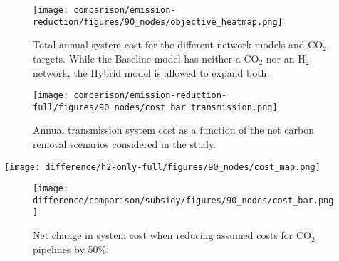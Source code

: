 \documentclass[twocolumn]{article}
\newcommand{\COtwo}{CO$_2$}
\newcommand{\Htwo}{H$_2$}
\newcommand{\Hgrid}{H$_2$\=/Grid}
\newcommand{\modBase}{Baseline model}
\newcommand{\modH}{H$_2$\=/Grid model}
\newcommand{\modHybrid}{Hybrid model}
\begin{document}
\printbibliography

\appendix




\begin{figure}
    \centering
    \texttt{[image: comparison/emission-reduction/figures/90\_nodes/objective\_heatmap.png]}
    \caption{Total annual system cost for the different network models and \COtwo{} targets. While the \modBase{} has neither a \COtwo{} nor an \Htwo{} network, the \modHybrid{} is allowed to expand both.}
    \label{fig:objective_heatmap}
\end{figure}


\begin{figure}[ht]
    \centering
    \texttt{[image: comparison/emission-reduction-full/figures/90\_nodes/cost\_bar\_transmission.png]}
    \caption{Annual transmission system cost as a function of the net carbon removal scenarios considered in the study.}
    \label{fig:cost_bar_transmission}
\end{figure}


\begin{figure*}[ht]
    \centering
    \texttt{[image: difference/h2-only-full/figures/90\_nodes/cost\_map.png]}
    \caption{Difference in cost investments between the \Hgrid{} and \modHybrid{}s. The left subfigure shows higher spendings per technology and region and transport system for the \modH{}, the right shows higher spendings in the \modHybrid{}.}
    \label{fig:cost_map_difference}
\end{figure*}

\begin{figure}[htb!]
    \centering
    \texttt{[image: difference/comparison/subsidy/figures/90\_nodes/cost\_bar.png]}
    \caption[short]{Net change in system cost when reducing assumed costs for \COtwo{} pipelines by 50\%.}
    \label{fig:net-negative_cost_bar}
\end{figure}
\end{document}
